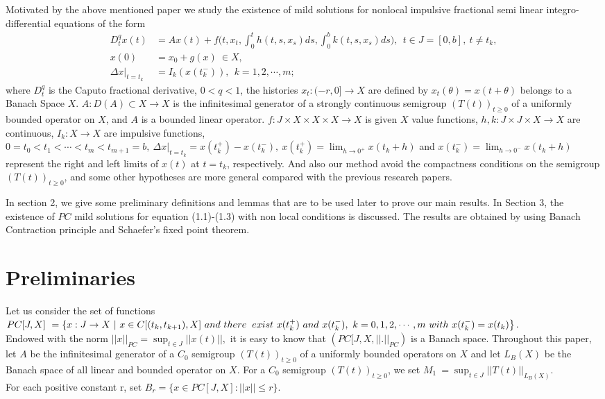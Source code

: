 \documentclass[11pt]{article}
\begin{document}
Motivated by the above mentioned paper we study the existence of mild solutions for nonlocal impulsive fractional semi linear integro-differential equations of the form 
\begin{align*}
D^q_tx(t)&=Ax(t)+f\Big(t,x_t,\int^t_0h(t,s,x_s)ds,\int^b_0k(t,s,x_s)ds\Big),\ \ t\in J=[0,b], \ t\neq t_k, \\
x(0)&=x_0+g(x) \ \in X,  \\
\Delta x|_{t=t_k} &=I_k(x(t_k^-)), \ \ k=1,2,\cdots, m; 
\end{align*}
\noindent where $D_t^q $ is the Caputo fractional derivative, $0<q<1$, the histories $x_t : (-r,0] \rightarrow X$ are defined by $x_t (\theta)=x(t+\theta) $ belongs to a Banach Space $X$.  $A:D(A) \subset X \rightarrow X$ is the infinitesimal generator of a strongly continuous semigroup $(T(t))_{t\geq 0}$ of a uniformly bounded operator on $X$, and $A$ is a bounded linear operator. $f:J \times X \times X \times X \rightarrow X$ is given $X$ value functions, $h,k :J  \times J \times X \rightarrow X$ are continuous, $I_k:X \rightarrow X$ are impulsive functions, $0=t_0<t_1<\cdots <t_m<t_{m+1}=b, \ \Delta x |_{t=t_k}=x(t_k^+)-x(t_k^-), \ x(t_k^+)=\displaystyle\lim_{h \rightarrow 0^+} x(t_k+h)$ and $x(t_k^-)=\displaystyle\lim_{h \rightarrow 0^-}x(t_k+h)$ represent the right and left limits of $x(t)$ at $t=t_k$, respectively.  And also our method avoid the compactness conditions on the semigroup $(T(t))_{t \geq 0}$, and some other hypotheses are more general compared with the previous research papers.
\par In section 2, we give some preliminary definitions and lemmas that are to be used later to prove our main results. In Section 3, the existence of $PC$ mild solutions for equation (1.1)-(1.3) with non local conditions is discussed.  The results are obtained by using Banach Contraction principle and Schaefer's fixed point theorem.
\setcounter{equation}{0}

\section{Preliminaries}
\par Let us consider the set of functions $PC[J,X] \ = \left\{x:J \rightarrow X \ | \ x\in C[(t_k,t_{k+1}), X] \ and \ there \right. \\ \left. exist \ x(t_k^+) \ and  \ x(t_k^-), \ k=0,1,2,\cdots,m \ with \ x(t_k^-)=x(t_k) \right\}$.\\
Endowed with the norm $||x||_{PC}=\displaystyle\sup_{t\in J}||x(t)||,$ it is easy to know that $(PC[J, X, ||.||_{PC})$ is a Banach space. Throughout this paper, let $A$ be the infinitesimal generator of a $C_0$ semigroup $(T(t))_{t\geq 0}$ of a uniformly bounded operators on $X$ and let $L_B(X)$ be the Banach space of all linear and bounded operator on $X$. For a $C_0$ semigroup $(T(t))_{t\geq 0}$, we set $M_1 \ = \displaystyle\sup_{t\in J}||T(t)||_{L_B(X)}.$ \\ 
For each positive constant r, set $B_r=\{x\in PC[J,X]:||x||\leq r\}.$
\end{document}
